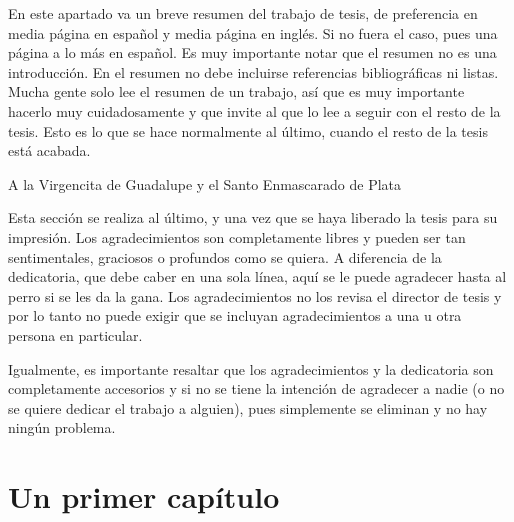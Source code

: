 \documentclass[12pt]{tesislcc}
\begin{document}

\frontcover

\frontmatter

\begin{summary}
En este apartado va un breve resumen del trabajo de tesis, de preferencia en media página en 
español y media página en inglés. Si no fuera el caso, pues una página a lo más en español. Es muy 
importante notar que el resumen no es una introducción. En el resumen no debe incluirse 
referencias bibliográficas ni listas. Mucha gente solo lee el resumen de un trabajo, así que es 
muy importante hacerlo muy cuidadosamente y que invite al que lo lee a seguir con el resto de la 
tesis. Esto es lo que se hace normalmente al último, cuando el resto de la tesis está acabada.
\end{summary}

\begin{dedication}
A la Virgencita de Guadalupe y el Santo Enmascarado de Plata
\end{dedication}

\begin{acknowledgements}
Esta sección se realiza al último, y una vez que se haya liberado la
tesis para su impresión. Los agradecimientos son completamente libres y pueden ser tan 
sentimentales, graciosos o profundos como se quiera. A diferencia de la dedicatoria, que debe 
caber en una sola línea, aquí se le puede agradecer hasta al perro si se les da la gana. Los 
agradecimientos no los revisa el director de tesis y por lo tanto no puede exigir que se incluyan 
agradecimientos a una u otra
persona en particular.

Igualmente, es importante resaltar que los agradecimientos y la
dedicatoria son completamente accesorios y si no se tiene la intención de agradecer a nadie (o no 
se quiere dedicar el trabajo a alguien), pues simplemente se eliminan y no hay ningún problema.
\end{acknowledgements}

\tableofcontents

\mainmatter

\introduccion


\chapter{Un primer capítulo}

\end{document}
